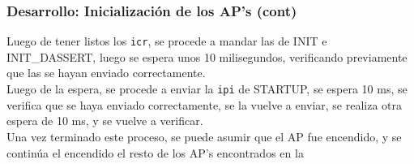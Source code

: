 \documentclass{beamer}
\begin{document}
\begin{frame}
  \frametitle{Desarrollo: \small Inicialización de los AP's (cont)}
  Luego de tener listos los \texttt{icr}, se procede a mandar las  de INIT e INIT\_DASSERT, luego se espera unos 10 milisegundos, verificando previamente que las  se hayan enviado correctamente. \\
  \vspace{10pt}
  Luego de la espera, se procede a enviar la \texttt{ipi} de STARTUP, se espera 10 ms, se verifica que se haya enviado correctamente, se la vuelve a enviar, se realiza otra espera de 10 ms, y se vuelve a verificar.\\
  \vspace{10pt}
  Una vez terminado este proceso, se puede asumir que el AP fue encendido, y se continúa el encendido el resto de los AP's encontrados en la \\
\end{frame}

% 
\end{document}
